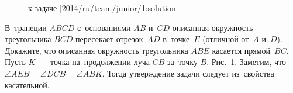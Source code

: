 \ifsolution
\begin{figure}\centering
    \caption{к задаче \ref{2014/ru/team/junior/1:solution}}
    \label{2014/ru/team/junior/1:solution:fig}
\end{figure}%
\fi %

\problem{}
В~трапеции $ABCD$ с~основаниями $AB$ и~$CD$ описанная окружность треугольника
$BCD$ пересекает отрезок~$AD$ в~точке~$E$ (отличной от~$A$ и~$D$).
Докажите, что описанная окружность треугольника $ABE$ касается прямой~$BC$.
\solution
\label{2014/ru/team/junior/1:solution}%
Пусть $K$~--- точка на~продолжении луча $CB$ за~точку $B$.
Рис.~\ref{2014/ru/team/junior/1:solution:fig}.
Заметим, что $\angle AEB = \angle DCB = \angle ABK$.
Тогда утверждение задачи следует из~свойства касательной.
\endproblem
